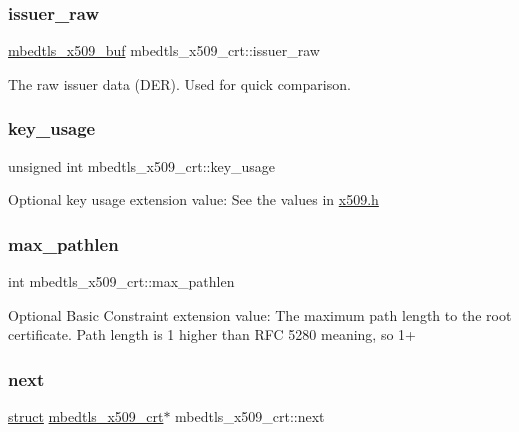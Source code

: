 \subsubsection{\texorpdfstring{issuer\+\_\+raw}{issuer\_raw}}
{\footnotesize\ttfamily \hyperlink{group__x509__module_ga4d02c9e8e4e2934555e0d132cd2976dc}{mbedtls\+\_\+x509\+\_\+buf} mbedtls\+\_\+x509\+\_\+crt\+::issuer\+\_\+raw}

The raw issuer data (D\+ER). Used for quick comparison. \mbox{\label{structmbedtls__x509__crt_a3b7650600aa6e637b8ab534a938aee94}} 
\subsubsection{\texorpdfstring{key\+\_\+usage}{key\_usage}}
{\footnotesize\ttfamily unsigned int mbedtls\+\_\+x509\+\_\+crt\+::key\+\_\+usage}

Optional key usage extension value\+: See the values in \hyperlink{x509_8h}{x509.\+h} \mbox{\label{structmbedtls__x509__crt_ab0af43652f426ace28052ec47fdde6fb}} 
\subsubsection{\texorpdfstring{max\+\_\+pathlen}{max\_pathlen}}
{\footnotesize\ttfamily int mbedtls\+\_\+x509\+\_\+crt\+::max\+\_\+pathlen}

Optional Basic Constraint extension value\+: The maximum path length to the root certificate. Path length is 1 higher than R\+FC 5280 \textquotesingle{}meaning\textquotesingle{}, so 1+ \mbox{\label{structmbedtls__x509__crt_ac9dbc43b90ddd74fe55452495a304923}} 
\subsubsection{\texorpdfstring{next}{next}}
{\footnotesize\ttfamily \hyperlink{interfacestruct}{struct} \hyperlink{structmbedtls__x509__crt}{mbedtls\+\_\+x509\+\_\+crt}$\ast$ mbedtls\+\_\+x509\+\_\+crt\+::next}

